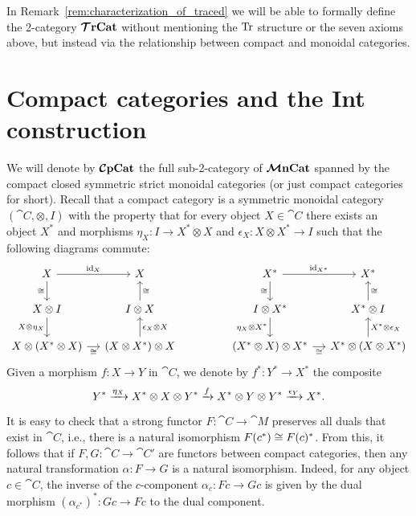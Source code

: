 \documentclass[11pt,oneside,article]{memoir}
\begin{document}
In Remark~\ref{rem:characterization_of_traced} we will be able to formally define the 2-category
$\bm{\mathcal{T}}\mathbf{rCat}$ without mentioning the $\operatorname{Tr}$ structure or the seven axioms above, but instead via the
relationship between compact and monoidal categories.

\section{Compact categories and the Int construction}
      \label{sec:compact_and_int}

We will denote by $\bm{\mathcal{C}}\mathbf{pCat}$ the full sub-2-category of $\bm{\mathcal{M}}\mathbf{nCat}$ spanned by the compact closed
symmetric strict monoidal categories (or just compact categories for short).  Recall that a compact
category is a symmetric monoidal category $(\cat{C},\otimes,I)$ with the property that for every
object $X\in\cat{C}$ there exists an object $X^*$ and morphisms $\eta_X\colon I\to X^*\otimes X$ and
$\epsilon_X\colon X\otimes X^*\to I$ such that the following diagrams commute:
\begin{equation*}
   \begin{tikzcd}[column sep=small]
      X\arrow[r,"\id_X"]\arrow[d,"\cong"'] & X \\
      X\otimes I\arrow[d,"X\otimes\eta_X"'] & I\otimes X\arrow[u,"\cong"'] \\
      X\otimes(X^*\otimes X)\arrow[r,"\cong"'] & (X\otimes X^*)\otimes X\arrow[u,"\epsilon_X\otimes X"']
   \end{tikzcd}
   \hspace{.6in}
   \begin{tikzcd}[column sep=small]
      X^*\arrow[r,"\id_{X^*}"]\arrow[d,"\cong"'] & X^*\\
      I\otimes X^*\arrow[d,"\eta_X\otimes X^*"'] & X^*\otimes I\arrow[u,"\cong"'] \\
      (X^*\otimes X)\otimes X^*\arrow[r,"\cong"'] & X^*\otimes (X\otimes X^*)\arrow[u,"X^*\otimes\epsilon_X"']
   \end{tikzcd}
\end{equation*}
Given a morphism $f\colon X\to Y$ in $\cat{C}$, we denote by $f^*\colon Y^*\to X^*$ the composite
\begin{equation*}
   Y^*\xrightarrow{\eta_X}X^*\otimes X\otimes Y^* \xrightarrow{f}X^*\otimes Y\otimes Y^*\xrightarrow{\epsilon_Y}X^*.
\end{equation*}

It is easy to check that a strong functor $F\colon\cat{C}\to\cat{M}$ preserves all duals that exist
in $\cat{C}$, i.e., there is a natural isomorphism $F(c^*)\cong F(c)^*$. From this, it follows that
if $F,G\colon\cat{C}\to\cat{C'}$ are functors between compact categories, then any natural
transformation $\alpha\colon F\to G$ is a natural isomorphism. Indeed, for any object $c\in\cat{C}$,
the inverse of the $c$-component $\alpha_c\colon Fc\to Gc$ is given by the dual morphism
$(\alpha_{c^*})^*\colon Gc\to Fc$ to the dual component.
\end{document}
